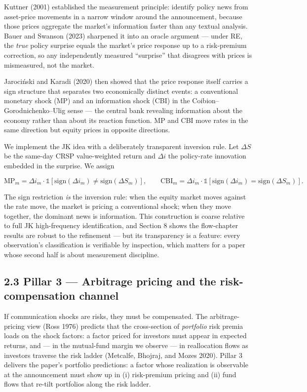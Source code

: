 Kuttner (2001) established the measurement principle: identify policy news from asset-price movements in a narrow window around the announcement, because those prices aggregate the market's information faster than any textual analysis. Bauer and Swanson (2023) sharpened it into an oracle argument --- under RE, the \emph{true} policy surprise equals the market's price response up to a risk-premium correction, so any independently measured ``surprise'' that disagrees with prices is mismeasured, not the market.

Jarociński and Karadi (2020) then showed that the price response itself carries a sign structure that separates two economically distinct events: a conventional monetary shock (MP) and an information shock (CBI) in the Coibion--Gorodnichenko--Ulig sense --- the central bank revealing information about the economy rather than about its reaction function. MP and CBI move rates in the same direction but equity prices in opposite directions.

We implement the JK idea with a deliberately transparent inversion rule. Let \(\Delta S\) be the same-day CRSP value-weighted return and \(\Delta i\) the policy-rate innovation embedded in the surprise. We assign

\[\text{MP}_m = \Delta i_m \cdot \mathbb{1}[\text{sign}(\Delta i_m) \neq \text{sign}(\Delta S_m)], \qquad \text{CBI}_m = \Delta i_m \cdot \mathbb{1}[\text{sign}(\Delta i_m) = \text{sign}(\Delta S_m)].\]

The sign restriction \emph{is} the inversion rule: when the equity market moves against the rate move, the market is pricing a conventional shock; when they move together, the dominant news is information. This construction is coarse relative to full JK high-frequency identification, and Section 8 shows the flow-chapter results are robust to the refinement --- but its transparency is a feature: every observation's classification is verifiable by inspection, which matters for a paper whose second half is about measurement discipline.

\subsection{2.3 Pillar 3 --- Arbitrage pricing and the risk-compensation channel}\label{pillar-3-arbitrage-pricing-and-the-risk-compensation-channel}

If communication shocks are risks, they must be compensated. The arbitrage-pricing view (Ross 1976) predicts that the cross-section of \emph{portfolio} risk premia loads on the shock factors: a factor priced for investors must appear in expected returns, and --- in the mutual-fund margin we observe --- in reallocation flows as investors traverse the risk ladder (Metcalfe, Bhojraj, and Mozes 2020). Pillar 3 delivers the paper's portfolio predictions: a factor whose realization is observable at the announcement must show up in (i) risk-premium pricing and (ii) fund flows that re-tilt portfolios along the risk ladder.


